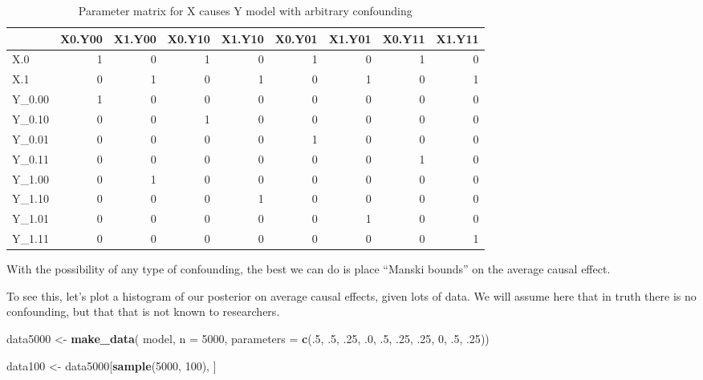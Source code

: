 \documentclass[
  12pt,
]{book}
\newenvironment{Shaded}{\begin{snugshade}}{\end{snugshade}}
\newcommand{\DataTypeTok}[1]{\textcolor[rgb]{0.13,0.29,0.53}{#1}}
\newcommand{\DecValTok}[1]{\textcolor[rgb]{0.00,0.00,0.81}{#1}}
\newcommand{\FloatTok}[1]{\textcolor[rgb]{0.00,0.00,0.81}{#1}}
\newcommand{\KeywordTok}[1]{\textcolor[rgb]{0.13,0.29,0.53}{\textbf{#1}}}
\newcommand{\NormalTok}[1]{#1}
\newcommand{\StringTok}[1]{\textcolor[rgb]{0.31,0.60,0.02}{#1}}
\begin{document}
\begin{table}

\caption{\label{tab:unnamed-chunk-58}Parameter matrix for X causes Y model with arbitrary confounding}
\centering
\begin{tabular}[t]{l|r|r|r|r|r|r|r|r}
\hline
  & X0.Y00 & X1.Y00 & X0.Y10 & X1.Y10 & X0.Y01 & X1.Y01 & X0.Y11 & X1.Y11\\
\hline
X.0 & 1 & 0 & 1 & 0 & 1 & 0 & 1 & 0\\
\hline
X.1 & 0 & 1 & 0 & 1 & 0 & 1 & 0 & 1\\
\hline
Y\_0.00 & 1 & 0 & 0 & 0 & 0 & 0 & 0 & 0\\
\hline
Y\_0.10 & 0 & 0 & 1 & 0 & 0 & 0 & 0 & 0\\
\hline
Y\_0.01 & 0 & 0 & 0 & 0 & 1 & 0 & 0 & 0\\
\hline
Y\_0.11 & 0 & 0 & 0 & 0 & 0 & 0 & 1 & 0\\
\hline
Y\_1.00 & 0 & 1 & 0 & 0 & 0 & 0 & 0 & 0\\
\hline
Y\_1.10 & 0 & 0 & 0 & 1 & 0 & 0 & 0 & 0\\
\hline
Y\_1.01 & 0 & 0 & 0 & 0 & 0 & 1 & 0 & 0\\
\hline
Y\_1.11 & 0 & 0 & 0 & 0 & 0 & 0 & 0 & 1\\
\hline
\end{tabular}
\end{table}

With the possibility of any type of confounding, the best we can do is place ``Manski bounds'' on the average causal effect.

To see this, let's plot a histogram of our posterior on average causal effects, given lots of data. We will assume here that in truth there is no confounding, but that that is not known to researchers.

\begin{Shaded}
\begin{Highlighting}[]
\NormalTok{data5000 <-}\StringTok{ }\KeywordTok{make_data}\NormalTok{(}
\NormalTok{    model, }\DataTypeTok{n =} \DecValTok{5000}\NormalTok{, }
    \DataTypeTok{parameters =} \KeywordTok{c}\NormalTok{(.}\DecValTok{5}\NormalTok{, }\FloatTok{.5}\NormalTok{, }\FloatTok{.25}\NormalTok{, }\FloatTok{.0}\NormalTok{, }\FloatTok{.5}\NormalTok{, }\FloatTok{.25}\NormalTok{, }\FloatTok{.25}\NormalTok{, }\DecValTok{0}\NormalTok{, }\FloatTok{.5}\NormalTok{, }\FloatTok{.25}\NormalTok{))}

\NormalTok{data100 <-}\StringTok{ }\NormalTok{data5000[}\KeywordTok{sample}\NormalTok{(}\DecValTok{5000}\NormalTok{, }\DecValTok{100}\NormalTok{), ]}
\end{Highlighting}
\end{Shaded}
\end{document}
